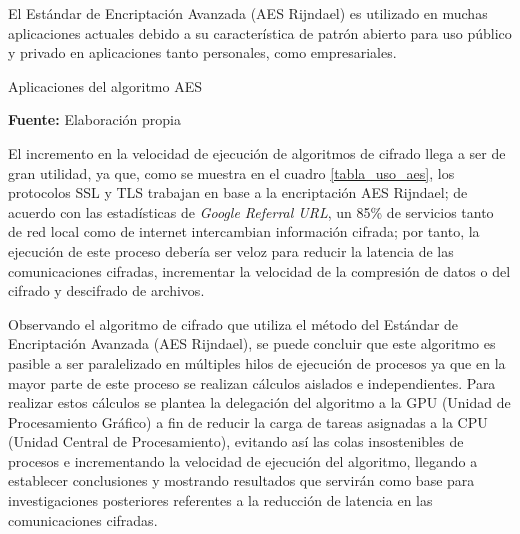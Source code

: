 \documentclass[../main/main.tex]{subfiles}
\begin{document}
  El Estándar de Encriptación Avanzada (AES Rijndael) es utilizado en muchas aplicaciones actuales debido a su característica de patrón abierto para uso público y privado en aplicaciones tanto personales, como empresariales.

  \begin{table}
    \centering
    \caption{Aplicaciones del algoritmo AES}
    
    \caption*{\textbf{Fuente:} Elaboración propia}
    \label{tabla_uso_aes}
  \end{table}

  El incremento en la velocidad de ejecución de algoritmos de cifrado llega a ser de gran utilidad, ya que, como se muestra en el cuadro \ref{tabla_uso_aes}, los protocolos SSL y TLS trabajan en base a la encriptación AES Rijndael; de acuerdo con las estadísticas de \emph{Google Referral URL}, un 85\% de servicios tanto de red local como de internet intercambian información cifrada; por tanto, la ejecución de este proceso debería ser veloz para reducir la latencia de las comunicaciones cifradas, incrementar la velocidad de la compresión de datos o del cifrado y descifrado de archivos.

  Observando el algoritmo de cifrado que utiliza el método del Estándar de Encriptación Avanzada (AES Rijndael), se puede concluir que este algoritmo es pasible a ser paralelizado en múltiples hilos de ejecución de procesos ya que en la mayor parte de este proceso se realizan cálculos aislados e independientes. Para realizar estos cálculos se plantea la delegación del algoritmo a la GPU (Unidad de Procesamiento Gráfico) a fin de reducir la carga de tareas asignadas a la CPU (Unidad Central de Procesamiento), evitando así las colas insostenibles de procesos e incrementando la velocidad de ejecución del algoritmo, llegando a establecer conclusiones y mostrando resultados que servirán como base para investigaciones posteriores referentes a la reducción de latencia en las comunicaciones cifradas.
\end{document}
